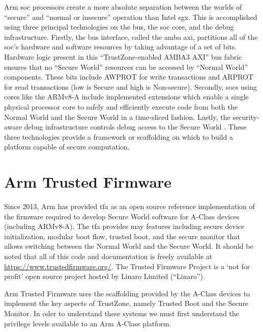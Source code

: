 Arm \gls{soc} processors create a more absolute separation between the worlds of ``secure'' and ``normal or insecure'' operation than Intel \gls{sgx}. This is accomplished using three principal technologies on the bus, the \gls{soc} core, and the debug infrastructure. Firstly, the bus interface, called the \gls{amba} \gls{axi}, partitions all of the \gls{soc}’s hardware and software resources by taking advantage of a set of bits. Hardware logic present in this ``TrustZone-enabled AMBA3 AXI'' bus fabric ensures that no ``Secure World'' resources can be accessed by ``Normal World'' components. These bits include AWPROT for write transactions and ARPROT for read transactions (low is Secure and high is Non-secure). Secondly, \gls{soc}s using cores like the ARMv8-A include implemented extensions which enable a single physical processor core to safely and efficiently execute code from both the Normal World and the Secure World in a time-sliced fashion. Lastly, the security-aware debug infrastructure controls debug access to the Secure World \cite{ArmWhitepaper}. These three technologies provide a framework or scaffolding on which to build a platform capable of secure computation.
\section{Arm Trusted Firmware}
Since 2013, Arm has provided \gls{tfa} as an open source reference implementation of the firmware required to develop Secure World software for A-Class devices (including ARMv8-A). The \gls{tfa} provides may features including secure device initialization, modular boot flow, trusted boot, and the secure monitor that allows switching between the Normal World and the Secure World. It should be noted that all of this code and documentation is freely available at \url{https://www.trustedfirmware.org/}. The Trusted Firmware Project is a `not for profit' open source project hosted by Linaro Limited (``Linaro'').

Arm Trusted Firmware uses the scaffolding provided by the A-Class devices to implement the key aspects of TrustZone, namely Trusted Boot and the Secure Monitor. In oder to understand these systems we must first understand the privilege levels available to an Arm A-Class platform.

